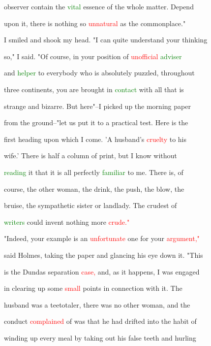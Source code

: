  observer contain the \textcolor{green}{vital} essence of the whole matter. \textcolor{BurntOrange}{Depend}

 upon it, there is nothing so \textcolor{red}{unnatural} as the \textcolor{BurntOrange}{commonplace."}



 I \textcolor{BurntOrange}{smiled} and shook my head. "I can quite understand your thinking

 so," I said. "Of course, in your position of \textcolor{red}{unofficial} \textcolor{green}{adviser}

 and \textcolor{green}{helper} to everybody who is absolutely puzzled, throughout

 three continents, you are brought in \textcolor{green}{contact} with all that is

 strange and \textcolor{BurntOrange}{bizarre.} But here"--I picked up the morning paper

 from the ground--"let us put it to a practical test. Here is the

 first heading upon which I come. 'A husband's \textcolor{red}{cruelty} to his

 wife.' There is half a column of print, but I know without

 \textcolor{green}{reading} it that it is all perfectly \textcolor{green}{familiar} to me. There is, of

 course, the other woman, the drink, the push, the blow, the

 \textcolor{BurntOrange}{bruise,} the \textcolor{BurntOrange}{sympathetic} sister or landlady. The crudest of

 \textcolor{green}{writers} could invent nothing more \textcolor{red}{crude."}



 "Indeed, your example is an \textcolor{red}{unfortunate} one for your \textcolor{red}{argument,"}

 said Holmes, taking the paper and glancing his eye down it. "This

 is the Dundas separation \textcolor{red}{case,} and, as it happens, I was engaged

 in clearing up some \textcolor{red}{small} points in connection with it. The

 husband was a teetotaler, there was no other woman, and the

 conduct \textcolor{red}{complained} of was that he had drifted into the habit of

 winding up every meal by taking out his false teeth and hurling

